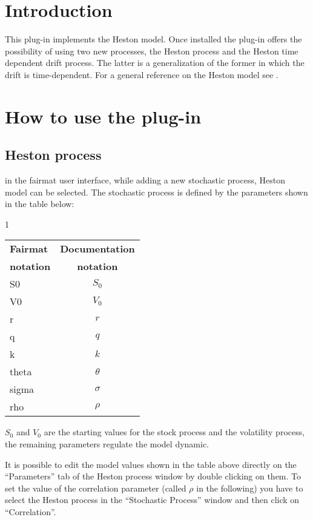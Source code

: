 \newcommand{\pluginName}{Heston Model}
\newcommand{\pluginVersion}{1.0.9}





\PluginTitle{\pluginName}{\pluginVersion}

\section{Introduction}
This plug-in implements the Heston model. Once installed the plug-in offers the possibility of using two new processes, the Heston process and the Heston time dependent drift process. 
The latter is a generalization of the former in which the drift is time-dependent. For a general reference on the Heston model see \cite{Heston:ClosedFormSol}.

\section{How to use the plug-in}

\subsection{Heston process}
in the fairmat user interface, while adding a new stochastic process, Heston model can be selected.
The stochastic process is defined by the parameters shown in the table below:
\begin{center}1
\begin{tabular}{|l|c|}
  \hline
\textbf{Fairmat}&\textbf{Documentation}\\
\textbf{notation}&\textbf{notation}\\
                     \hline
 S0     & $S_0$\\
 V0     & $V_0$\\
 r  & $r$\\
 q  & $q$\\
 k      & $k$ \\
 theta  & $\theta$\\
 sigma  & $\sigma$\\
rho & $\rho$ \\ 
   \hline
\end{tabular}
\end{center}
$S_0$ and $V_0$ are the starting values for the stock process and the volatility process, the remaining parameters regulate the model dynamic.

It is possible to edit the model values shown in the table above directly on the ``Parameters'' tab of the Heston process window by double clicking on them. To set the value of the correlation parameter (called $\rho$ in the following) you have to select the Heston process in the ``Stochastic Process'' window and then click on ``Correlation''.

